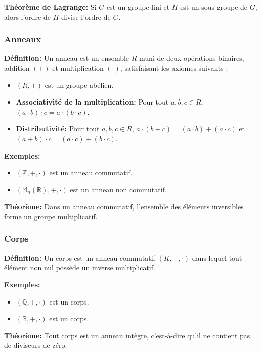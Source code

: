 \textbf{Théorème de Lagrange:}
Si $G$ est un groupe fini et $H$ est un sous-groupe de $G$, alors l'ordre de $H$ divise l'ordre de $G$.

\subsubsection{Anneaux}

\textbf{Définition:}
Un anneau est un ensemble $R$ muni de deux opérations binaires, addition $(+)$ et multiplication $(\cdot)$, satisfaisant les axiomes suivants :
\begin{itemize}
    \item $(R, +)$ est un groupe abélien.
    \item \textbf{Associativité de la multiplication:} Pour tout $a, b, c \in R$, $(a \cdot b) \cdot c = a \cdot (b \cdot c)$.
    \item \textbf{Distributivité:} Pour tout $a, b, c \in R$, $a \cdot (b + c) = (a \cdot b) + (a \cdot c)$ et $(a + b) \cdot c = (a \cdot c) + (b \cdot c)$.
\end{itemize}

\textbf{Exemples:}
\begin{itemize}
    \item $(\mathbb{Z}, +, \cdot)$ est un anneau commutatif.
    \item $(\mathbb{M}_n(\mathbb{R}), +, \cdot)$ est un anneau non commutatif.
\end{itemize}

\textbf{Théorème:}
Dans un anneau commutatif, l'ensemble des éléments inversibles forme un groupe multiplicatif.

\subsubsection{Corps}

\textbf{Définition:}
Un corps est un anneau commutatif $(K, +, \cdot)$ dans lequel tout élément non nul possède un inverse multiplicatif.

\textbf{Exemples:}
\begin{itemize}
    \item $(\mathbb{Q}, +, \cdot)$ est un corps.
    \item $(\mathbb{R}, +, \cdot)$ est un corps.
\end{itemize}

\textbf{Théorème:}
Tout corps est un anneau intègre, c'est-à-dire qu'il ne contient pas de diviseurs de zéro.

